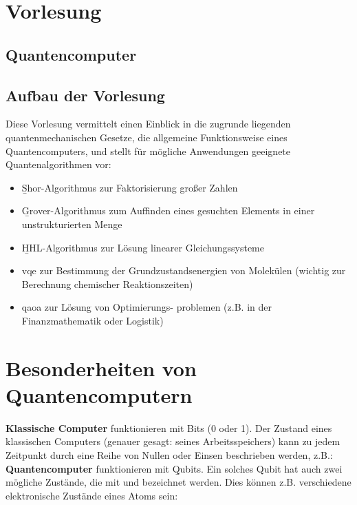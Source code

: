 \section{Vorlesung}
\subsection{Quantencomputer}
\subsection{Aufbau der Vorlesung}
Diese Vorlesung vermittelt einen Einblick in die zugrunde liegenden quantenmechanischen Gesetze, die allgemeine Funktionsweise eines Quantencomputers, und stellt für mögliche Anwendungen geeignete \b{Quantenalgorithmen} vor:
\begin{itemize}
    \item \b{Shor-Algorithmus} zur Faktorisierung großer Zahlen
    \item \b{Grover-Algorithmus} zum Auffinden eines gesuchten Elements in einer unstrukturierten Menge
    \item \b{HHL-Algorithmus} zur Lösung linearer Gleichungssysteme
    \item \b{\ac{vqe}} zur Bestimmung der Grundzustandsenergien von Molekülen (wichtig zur Berechnung chemischer Reaktionszeiten)
    \item \b{\ac{qaoa}} zur Lösung von Optimierungs- problemen (z.B. in der Finanzmathematik oder Logistik)
\end{itemize}
\section{Besonderheiten von Quantencomputern}
\textbf{Klassische Computer} funktionieren mit Bits (0 oder 1). Der Zustand eines klassischen Computers (genauer gesagt: seines Arbeitsspeichers) kann zu jedem Zeitpunkt durch eine Reihe von Nullen oder Einsen beschrieben werden, z.B.:
\textbf{Quantencomputer} funktionieren mit \b{Qubits}. Ein solches Qubit hat auch zwei mögliche Zustände, die mit  und  bezeichnet werden. Dies können z.B. verschiedene elektronische Zustände eines Atoms sein:


